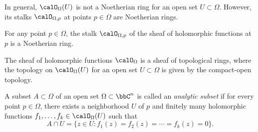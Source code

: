     In general, \(\calO_\Omega(U)\) is not a Noetherian ring for an open set \(U \subset \Omega\).
    However, its stalks \(\calO_{\Omega, p}\) at points \(p \in \Omega\) are Noetherian rings.

    \begin{example}\label{eg:ring_of_holomorphic_functions_is_not_Noetherian}
    \end{example}

    \begin{proposition}\label{prop:stalk_of_sheaf_of_holomorphic_functions_is_local_noetherian_regular}
        For any point \(p \in \Omega\), the stalk \(\calO_{\Omega, p}\) of the sheaf of holomorphic functions at \(p\) is a Noetherian ring.
    \end{proposition}

    \begin{remark}\label{rmk:topological_properties_stalk_of_sheaf_of_holomorphic_functions}
        The sheaf of holomorphic functions \(\calO_\Omega\) is a sheaf of topological rings, where the topology on \(\calO_\Omega(U)\) for an open set \(U \subset \Omega\) is given by the compact-open topology.
    \end{remark}

    \begin{definition}\label{def:analytic_subset}
        A subset \(A \subset \Omega\) of an open set \(\Omega \subset \bbC^n\) is called an \emph{analytic subset} if for every point \(p \in \Omega\), there exists a neighborhood \(U\) of \(p\) and finitely many holomorphic functions \(f_1, \ldots, f_k \in \calO_\Omega(U)\) such that 
        \[ A \cap U = \{ z \in U : f_1(z) = f_2(z) = \cdots = f_k(z) = 0 \}. \]
    \end{definition}